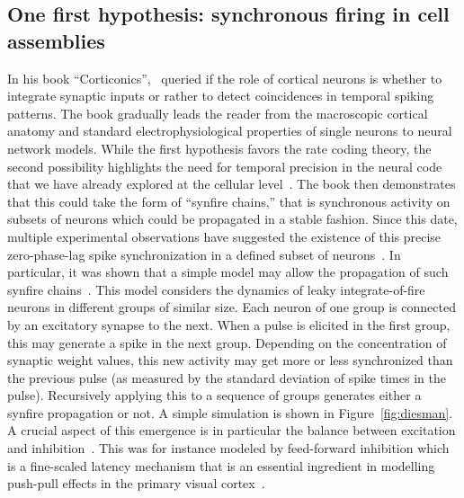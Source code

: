\documentclass[brainsci, %
               review,submit,pdftex,moreauthors%
               ]{Definitions/mdpi}
\begin{document}
\subsection{One first hypothesis: synchronous firing in cell assemblies}
%
In his book ``Corticonics'',~\citet{abeles_corticonics_1991} queried if the role of cortical neurons is whether to integrate synaptic inputs or rather to detect coincidences in temporal spiking patterns. The book gradually leads the reader from the macroscopic cortical anatomy and standard electrophysiological properties of single neurons to neural network models. While the first hypothesis favors the rate coding theory, the second possibility highlights the need for temporal precision in the neural code that we have already explored at the cellular level~\citep{paugam-moisy_computing_2012}. The book then demonstrates that this could take the form of ``synfire chains,'' that is synchronous activity on subsets of neurons which could be propagated in a stable fashion. Since this date, multiple experimental observations have suggested the existence of this precise zero-phase-lag spike synchronization in a defined subset of neurons~\citep{harris_organization_2003}.
%
In particular, it was shown that a simple model may allow the propagation of such synfire chains~\citep{gewaltig_propagation_1970}. This model considers the dynamics of leaky integrate-of-fire neurons in different groups of similar size. Each neuron of one group is connected by an excitatory synapse to the next. When a pulse is elicited in the first group, this may generate a spike in the next group. Depending on the concentration of synaptic weight values, this new activity may get more or less synchronized than the previous pulse (as measured by the standard deviation of spike times in the pulse). Recursively applying this to a sequence of groups generates either a synfire propagation or not. A simple simulation is shown in Figure~\ref{fig:diesman}. A crucial aspect of this emergence is in particular the balance between excitation and inhibition~\citep{azouz_stimulus-selective_2008}. This was for instance modeled by feed-forward inhibition which is a fine-scaled latency mechanism that is an essential ingredient in modelling push-pull effects in the primary visual cortex~\citep{kremkow_push-pull_2016}.
\end{document}

